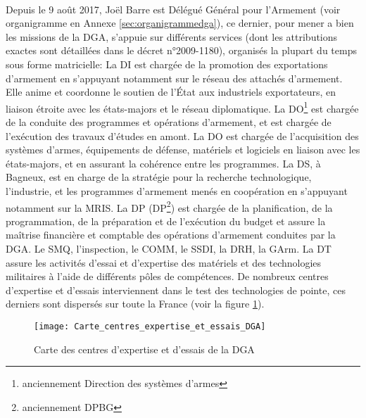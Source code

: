 \documentclass[11pt, book, english, french, standardlists]{upmethodology-document}
\begin{document}
				\paragraph*{}
					Depuis le 9 août 2017, Joël Barre est Délégué Général pour l'Armement (voir organigramme en Annexe \ref{sec:organigrammedga}), ce dernier, pour mener a bien les missions de la \gls{DGA}, s'appuie sur différents services (dont les attributions exactes sont détaillées dans le décret n°2009-1180\cite{DEFD0918712D}), organisés la plupart du temps sous forme matricielle:
					La \gls{DI} est chargée de la promotion des exportations d’armement en s’appuyant notamment sur le réseau des attachés d’armement. Elle anime et coordonne le soutien de l'État aux industriels exportateurs, en liaison étroite avec les états-majors et le réseau diplomatique.
					La \gls{DO}\footnote{anciennement Direction des systèmes d'armes} est chargée de la conduite des programmes et opérations d'armement, et est chargée de l’exécution des travaux d'études en amont. La \gls{DO} est chargée de l'acquisition des systèmes d'armes, équipements de défense, matériels et logiciels en liaison avec les états-majors, et en assurant la cohérence entre les programmes.
					La \gls{DS}, à Bagneux, est en charge de la stratégie pour la recherche technologique, l’industrie, et les programmes d’armement menés en coopération en s'appuyant notamment sur la \gls{MRIS}.
					La \acrlong{DP} (\acrshort{DP}\footnote{anciennement DPBG}) est chargée de la planification, de la programmation, de la préparation et de l'exécution du budget et assure la maîtrise financière et comptable des opérations d'armement conduites par la \gls{DGA}.
					Le \gls{SMQ}, l’inspection, le \gls{COMM}, le \gls{SSDI}, la \gls{DRH}, la \gls{GArm}.
					La \gls{DT} assure les activités d’essai et d’expertise des matériels et des technologies militaires à l’aide de différents pôles de compétences. De nombreux centres d’expertise et d’essais interviennent dans le test des technologies de pointe, ces derniers sont dispersés sur toute la France (voir la figure \ref{fig:Carte_centres_expertise_et_essais_DGA}).
					\begin{figure}[H]
						\centering
						\texttt{[image: Carte\_centres\_expertise\_et\_essais\_DGA]}
						\caption{Carte des centres d’expertise et d’essais de la \acrshort{DGA}\cite{OptroDefDGA}}
						\label{fig:Carte_centres_expertise_et_essais_DGA}
					\end{figure}
\end{document}
